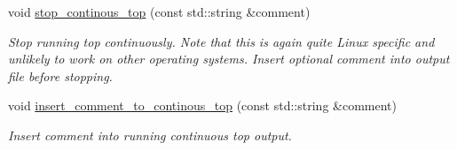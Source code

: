 \begin{DoxyCompactItemize}
void \hyperlink{namespaceoomph_1_1MemoryUsage_a64410078236ee55e630ee6416b4ccdb0}{stop\+\_\+continous\+\_\+top} (const std\+::string \&comment)
\begin{DoxyCompactList}\small\item\em Stop running top continuously. Note that this is again quite Linux specific and unlikely to work on other operating systems. Insert optional comment into output file before stopping. \end{DoxyCompactList}\item 
void \hyperlink{namespaceoomph_1_1MemoryUsage_a3426ed2144d50ce7a0941555b911c701}{insert\+\_\+comment\+\_\+to\+\_\+continous\+\_\+top} (const std\+::string \&comment)
\begin{DoxyCompactList}\small\item\em Insert comment into running continuous top output. \end{DoxyCompactList}\end{DoxyCompactItemize}

